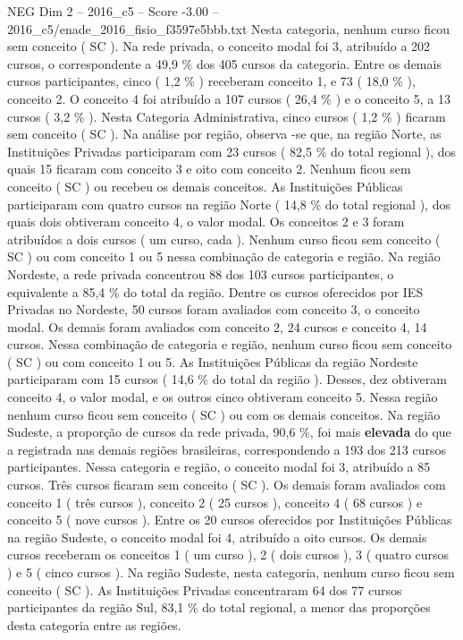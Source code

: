 \begin{textsample}{NEG Dim 2 – 2016\_c5 – Score -3.00 – 2016\_c5/enade\_2016\_fisio\_f3597e5bbb.txt}
Nesta categoria, nenhum curso ficou sem conceito ( SC ).
Na rede privada, o conceito modal foi 3, atribuído a 202 cursos, o correspondente a 49,9 \% dos 405 cursos da categoria.
Entre os demais cursos participantes, cinco ( 1,2 \% ) receberam conceito 1, e 73 ( 18,0 \% ), conceito 2.
O conceito 4 foi atribuído a 107 cursos ( 26,4 \% ) e o conceito 5, a 13 cursos ( 3,2 \% ).
Nesta Categoria Administrativa, cinco cursos ( 1,2 \% ) ficaram sem conceito ( SC ).
Na análise por região, observa -se que, na região Norte, as Instituições Privadas participaram com 23 cursos ( 82,5 \% do total regional ), dos quais 15 ficaram com conceito 3 e oito com conceito 2.
Nenhum ficou sem conceito ( SC ) ou recebeu os demais conceitos.
As Instituições Públicas participaram com quatro cursos na região Norte ( 14,8 \% do total regional ), dos quais dois obtiveram conceito 4, o valor modal.
Os conceitos 2 e 3 foram atribuídos a dois cursos ( um curso, cada ).
Nenhum curso ficou sem conceito ( SC ) ou com conceito 1 ou 5 nessa combinação de categoria e região.
Na região Nordeste, a rede privada concentrou 88 dos 103 cursos participantes, o equivalente a 85,4 \% do total da região.
Dentre os cursos oferecidos por IES Privadas no Nordeste, 50 cursos foram avaliados com conceito 3, o conceito modal.
Os demais foram avaliados com conceito 2, 24 cursos e conceito 4, 14 cursos.
Nessa combinação de categoria e região, nenhum curso ficou sem conceito ( SC ) ou com conceito 1 ou 5.
As Instituições Públicas da região Nordeste participaram com 15 cursos ( 14,6 \% do total da região ).
Desses, dez obtiveram conceito 4, o valor modal, e os outros cinco obtiveram conceito 5.
Nessa região nenhum curso ficou sem conceito ( SC ) ou com os demais conceitos.
Na região Sudeste, a proporção de cursos da rede privada, 90,6 \%, foi mais \textbf{elevada} do que a registrada nas demais regiões brasileiras, correspondendo a 193 dos 213 cursos participantes.
Nessa categoria e região, o conceito modal foi 3, atribuído a 85 cursos.
Três cursos ficaram sem conceito ( SC ).
Os demais foram avaliados com conceito 1 ( três cursos ), conceito 2 ( 25 cursos ), conceito 4 ( 68 cursos ) e conceito 5 ( nove cursos ).
Entre os 20 cursos oferecidos por Instituições Públicas na região Sudeste, o conceito modal foi 4, atribuído a oito cursos.
Os demais cursos receberam os conceitos 1 ( um curso ), 2 ( dois cursos ), 3 ( quatro cursos ) e 5 ( cinco cursos ).
Na região Sudeste, nesta categoria, nenhum curso ficou sem conceito ( SC ).
As Instituições Privadas concentraram 64 dos 77 cursos participantes da região Sul, 83,1 \% do total regional, a menor das proporções desta categoria entre as regiões.

\end{textsample}

